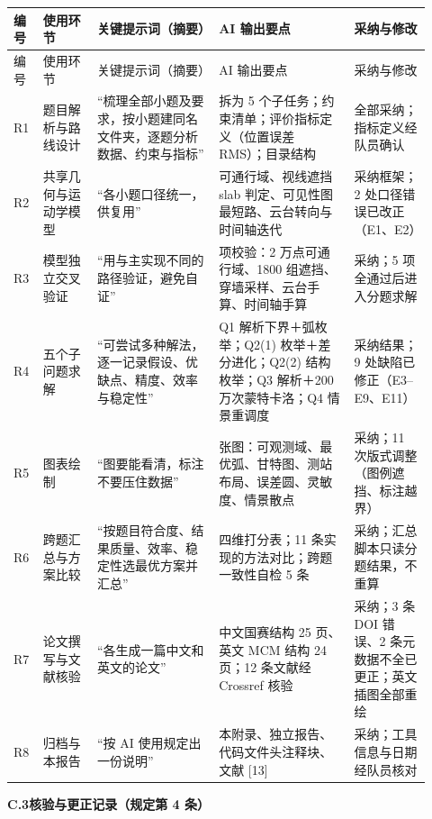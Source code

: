 {\begin{longtable}{@{}>{\raggedright\arraybackslash}p{0.045\linewidth}
                 >{\raggedright\arraybackslash}p{0.125\linewidth}
                 >{\raggedright\arraybackslash}p{0.27\linewidth}
                 >{\raggedright\arraybackslash}p{0.30\linewidth}
                 >{\raggedright\arraybackslash}p{0.175\linewidth}@{}}
\toprule
编号 & 使用环节 & 关键提示词（摘要） & AI 输出要点 & 采纳与修改 \\
\midrule
\endfirsthead
\toprule
编号 & 使用环节 & 关键提示词（摘要） & AI 输出要点 & 采纳与修改 \\
\midrule
\endhead
\bottomrule
\endlastfoot
R1 & 题目解析与路线设计 & “梳理全部小题及要求，按小题建同名文件夹，逐题分析数据、约束与指标” & 拆为 5 个子任务；约束清单；评价指标定义（位置误差 RMS）；目录结构 & 全部采纳；指标定义经队员确认 \\
R2 & 共享几何与运动学模型 & “各小题口径统一，供复用” & 可通行域、视线遮挡 slab 判定、可见性图最短路、云台转向与时间轴迭代 & 采纳框架；2 处口径错误已改正（E1、E2） \\
R3 & 模型独立交叉验证 & “用与主实现不同的路径验证，避免自证” & 5 项校验：2 万点可通行域、1800 组遮挡、穿墙采样、云台手算、时间轴手算 & 采纳；5 项全通过后进入分题求解 \\
R4 & 五个子问题求解 & “可尝试多种解法，逐一记录假设、优缺点、精度、效率与稳定性” & Q1 解析下界＋弧枚举；Q2(1) 枚举＋差分进化；Q2(2) 结构枚举；Q3 解析＋200 万次蒙特卡洛；Q4 情景重调度 & 采纳结果；9 处缺陷已修正（E3--E9、E11） \\
R5 & 图表绘制 & “图要能看清，标注不要压住数据” & 12 张图：可观测域、最优弧、甘特图、测站布局、误差圆、灵敏度、情景散点 & 采纳；11 次版式调整（图例遮挡、标注越界） \\
R6 & 跨题汇总与方案比较 & “按题目符合度、结果质量、效率、稳定性选最优方案并汇总” & 四维打分表；11 条实现的方法对比；跨题一致性自检 5 条 & 采纳；汇总脚本只读分题结果，不重算 \\
R7 & 论文撰写与文献核验 & “各生成一篇中文和英文的论文” & 中文国赛结构 25 页、英文 MCM 结构 24 页；12 条文献经 Crossref 核验 & 采纳；3 条 DOI 错误、2 条元数据不全已更正；英文插图全部重绘 \\
R8 & 归档与本报告 & “按 AI 使用规定出一份说明” & 本附录、独立报告、代码文件头注释块、文献 [13] & 采纳；工具信息与日期经队员核对 \\
\end{longtable}

\vspace{3pt}
\noindent\textbf{C.3\quad 核验与更正记录（规定第 4 条）}

}
